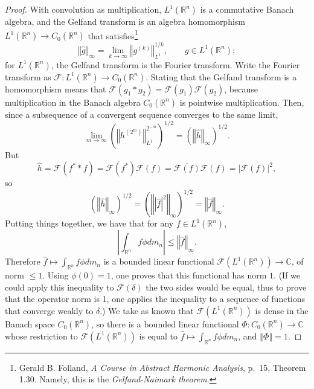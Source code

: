 \documentclass{article}
\newcommand{\norm}[1]{\left\Vert #1 \right\Vert}
\theoremstyle{definition}
\begin{document}
\begin{proof}
With convolution as multiplication, $L^1(\mathbb{R}^n)$ is a commutative Banach algebra, and the Gelfand
transform is an algebra homomorphism $L^1(\mathbb{R}^n) \to C_0(\mathbb{R}^n)$ that satisfies\footnote{Gerald B. Folland,
{\em A Course in Abstract Harmonic Analysis}, p.~15, Theorem 1.30. Namely, this is the {\em Gelfand-Naimark theorem}.}
\[
\norm{\hat{g}}_\infty = \lim_{k \to \infty} \norm{g^{(k)}}_{L^1}^{1/k}, \qquad g \in L^1(\mathbb{R}^n);
\]
for $L^1(\mathbb{R}^n)$, the Gelfand transform is the Fourier transform. Write the Fourier transform as 
$\mathscr{F}:L^1(\mathbb{R}^n) \to C_0(\mathbb{R}^n)$. Stating that the Gelfand transform is a homomorphism
means that $\mathscr{F}(g_1*g_2)=\mathscr{F}(g_1) \mathscr{F}(g_2)$, because multiplication in the Banach algebra $C_0(\mathbb{R}^n)$
is pointwise multiplication.
Then, since a subsequence of a convergent sequence converges to the same limit,
\[
\lim_{m \to \infty} \left(\norm{h^{\left(2^m\right)}}_{L^1}^{2^{-m}}\right)^{1/2} = \left( \norm{\hat{h}}_\infty \right)^{1/2}.
\]
But
\[
\hat{h}=\mathscr{F}(f^* * f) = \mathscr{F}(f^*) \mathscr{F}(f) = \overline{\mathscr{F}(f)} \mathscr{F}(f)= \left| \mathscr{F}(f) \right|^2,
\]
so
\[
\left( \norm{\hat{h}}_\infty \right)^{1/2} = \left( \norm{|\hat{f}|^2}_\infty \right)^{1/2} = \norm{\hat{f}}_\infty.
\]
Putting things together, we have that for any $f \in L^1(\mathbb{R}^n)$,
\[
\left| \int_{\mathbb{R}^n} f \phi dm_n \right| \leq \norm{\hat{f}}_\infty.
\]
Therefore $\hat{f} \mapsto \int_{\mathbb{R}^n} f \phi dm_n$ is a bounded linear functional $\mathscr{F}(L^1(\mathbb{R}^n)) \to \mathbb{C}$, of norm
$\leq 1$. Using $\phi(0)=1$, one proves that this functional has norm $1$. (If we could apply this inequality to $\mathscr{F}(\delta)$ the two sides would be equal, thus
 to prove that the operator norm is 1, one applies the inequality to a sequence of functions that converge weakly to $\delta$.)
We take as known that $\mathscr{F}(L^1(\mathbb{R}^n))$ is dense in the Banach space $C_0(\mathbb{R}^n)$, so there is a 
bounded linear functional $\Phi:C_0(\mathbb{R}^n) \to \mathbb{C}$ whose restriction to
$\mathscr{F}(L^1(\mathbb{R}^n))$ is equal to $\hat{f} \mapsto \int_{\mathbb{R}^n} f \phi dm_n$, and  $\norm{\Phi}=1$.


\end{proof}
\end{document}

